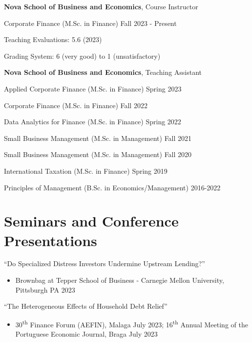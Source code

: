 \documentclass[letterpaper]{article}
\newenvironment{itemize*}{
  \begin{list}{}{
    \setlength{\leftmargin}{1.5em}
  }
}{
  \end{list}
}
\begin{document}
\begin{itemize*} 
\item \textbf{Nova School of Business and Economics}, Course Instructor
\begin{itemize*}
\item Corporate Finance (M.Sc. in Finance) \hfill Fall 2023 - Present
\begin{itemize*}
\item Teaching Evaluations: 5.6 (2023) 
\item Grading System: 6 (very good) to 1 (unsatisfactory)
\end{itemize*}
\end{itemize*}
\item \textbf{Nova School of Business and Economics}, Teaching Assistant
\begin{itemize*}
\item Applied Corporate Finance (M.Sc. in Finance) \hfill Spring 2023
\item Corporate Finance (M.Sc. in Finance) \hfill Fall 2022
\item Data Analytics for Finance (M.Sc. in Finance) \hfill Spring 2022
\item Small Business Management (M.Sc. in Management)  \hfill Fall 2021
\item Small Business Management (M.Sc. in Management)  \hfill Fall 2020
\item International Taxation (M.Sc. in Finance) \hfill Spring 2019
\item Principles of Management (B.Sc. in Economics/Management) \hfill 2016-2022
\end{itemize*}
\end{itemize*}

\section*{Seminars and Conference Presentations}
\begin{itemize*}
\item ``Do Specialized Distress Investors Undermine Upstream Lending?''
\begin{itemize}
\item Brownbag at Tepper School of Business - Carnegie Mellon University, Pittsburgh PA 2023
\end{itemize}
\item ``The Heterogeneous Effects of Household Debt Relief''
\begin{itemize}
\item 30\textsuperscript{th} Finance Forum (AEFIN), Malaga July 2023; 16\textsuperscript{th} Annual Meeting of the Portuguese Economic Journal, Braga July 2023
\end{itemize}
\end{itemize*}
\end{document}
